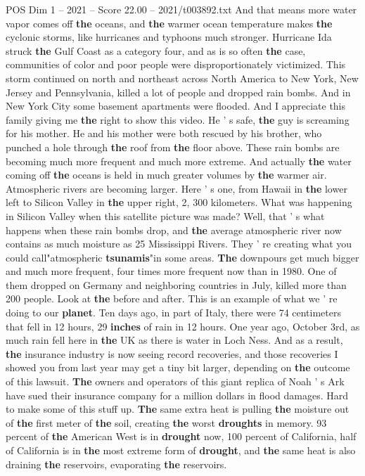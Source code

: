 \begin{textsample}{POS Dim 1 – 2021 – Score 22.00 – 2021/t003892.txt}
And that means more water vapor comes off \textbf{the} oceans, and \textbf{the} warmer ocean temperature makes \textbf{the} cyclonic storms, like hurricanes and typhoons much stronger.
Hurricane Ida struck \textbf{the} Gulf Coast as a category four, and as is so often \textbf{the} case, communities of color and poor people were disproportionately victimized.
This storm continued on north and northeast across North America to New York, New Jersey and Pennsylvania, killed a lot of people and dropped rain bombs.
And in New York City some basement apartments were flooded.
And I appreciate this family giving me \textbf{the} right to show this video.
He ' s safe, \textbf{the} guy is screaming for his mother.
He and his mother were both rescued by his brother, who punched a hole through \textbf{the} roof from \textbf{the} floor above.
These rain bombs are becoming much more frequent and much more extreme.
And actually \textbf{the} water coming off \textbf{the} oceans is held in much greater volumes by \textbf{the} warmer air.
Atmospheric rivers are becoming larger.
Here ' s one, from Hawaii in \textbf{the} lower left to Silicon Valley in \textbf{the} upper right, 2, 300 kilometers.
What was happening in Silicon Valley when this satellite picture was made?
Well, that ' s what happens when these rain bombs drop, and \textbf{the} average atmospheric river now contains as much moisture as 25 Mississippi Rivers.
They ' re creating what you could call"atmospheric \textbf{tsunamis}"in some areas. \textbf{The} downpours get much bigger and much more frequent, four times more frequent now than in 1980.
One of them dropped on Germany and neighboring countries in July, killed more than 200 people.
Look at \textbf{the} before and after.
This is an example of what we ' re doing to our \textbf{planet}.
Ten days ago, in part of Italy, there were 74 centimeters that fell in 12 hours, 29 \textbf{inches} of rain in 12 hours.
One year ago, October 3rd, as much rain fell here in \textbf{the} UK as there is water in Loch Ness.
And as a result, \textbf{the} insurance industry is now seeing record recoveries, and those recoveries I showed you from last year may get a tiny bit larger, depending on \textbf{the} outcome of this lawsuit. \textbf{The} owners and operators of this giant replica of Noah ' s Ark have sued their insurance company for a million dollars in flood damages.
Hard to make some of this stuff up. \textbf{The} same extra heat is pulling \textbf{the} moisture out of \textbf{the} first meter of \textbf{the} soil, creating \textbf{the} worst \textbf{droughts} in memory. 93 percent of \textbf{the} American West is in \textbf{drought} now, 100 percent of California, half of California is in \textbf{the} most extreme form of \textbf{drought}, and \textbf{the} same heat is also draining \textbf{the} reservoirs, evaporating \textbf{the} reservoirs.

\end{textsample}
